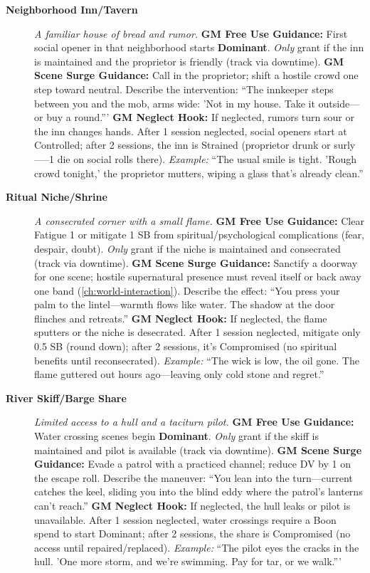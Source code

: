 \begin{description}
  \item[\textbf{Neighborhood Inn/Tavern}]   
        \emph{A familiar house of bread and rumor.}  
        \textbf{GM Free Use Guidance:} First social opener in that neighborhood starts \textbf{Dominant}. \emph{Only} grant if the inn is maintained and the proprietor is friendly (track via downtime).  
        \textbf{GM Scene Surge Guidance:} Call in the proprietor; shift a hostile crowd one step toward neutral. Describe the intervention: ``The innkeeper steps between you and the mob, arms wide: 'Not in my house. Take it outside---or buy a round.'''  
        \textbf{GM Neglect Hook:} If neglected, rumors turn sour or the inn changes hands. After 1 session neglected, social openers start at Controlled; after 2 sessions, the inn is Strained (proprietor drunk or surly-----1 die on social rolls there).  
        \textit{Example:} ``The usual smile is tight. 'Rough crowd tonight,' the proprietor mutters, wiping a glass that's already clean.''  

  \item[\textbf{Ritual Niche/Shrine}]   
        \emph{A consecrated corner with a small flame.}  
        \textbf{GM Free Use Guidance:} Clear Fatigue 1 or mitigate 1 SB from spiritual/psychological complications (fear, despair, doubt). \emph{Only} grant if the niche is maintained and consecrated (track via downtime).  
        \textbf{GM Scene Surge Guidance:} Sanctify a doorway for one scene; hostile supernatural presence must reveal itself or back away one band (\ref{ch:world-interaction}). Describe the effect: ``You press your palm to the lintel---warmth flows like water. The shadow at the door flinches and retreats.''  
        \textbf{GM Neglect Hook:} If neglected, the flame sputters or the niche is desecrated. After 1 session neglected, mitigate only 0.5 SB (round down); after 2 sessions, it's Compromised (no spiritual benefits until reconsecrated).  
        \textit{Example:} ``The wick is low, the oil gone. The flame guttered out hours ago---leaving only cold stone and regret.''  

  \item[\textbf{River Skiff/Barge Share}]   
        \emph{Limited access to a hull and a taciturn pilot.}  
        \textbf{GM Free Use Guidance:} Water crossing scenes begin \textbf{Dominant}. \emph{Only} grant if the skiff is maintained and pilot is available (track via downtime).  
        \textbf{GM Scene Surge Guidance:} Evade a patrol with a practiced channel; reduce DV by 1 on the escape roll. Describe the maneuver: ``You lean into the turn---current catches the keel, sliding you into the blind eddy where the patrol's lanterns can't reach.''  
        \textbf{GM Neglect Hook:} If neglected, the hull leaks or pilot is unavailable. After 1 session neglected, water crossings require a Boon spend to start Dominant; after 2 sessions, the share is Compromised (no access until repaired/replaced).  
        \textit{Example:} ``The pilot eyes the cracks in the hull. 'One more storm, and we're swimming. Pay for tar, or we walk.'''  


\end{description}
